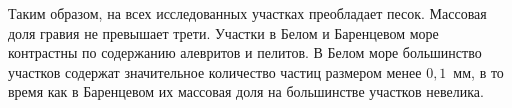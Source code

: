 \par\bigskip
Таким образом, на всех исследованных участках преобладает песок.
Массовая доля гравия не превышает трети.
Участки в Белом и Баренцевом море контрастны по содержанию алевритов и пелитов. 
В Белом море большинство участков содержат значительное количество частиц размером менее $0,1$~мм, в то время как в Баренцевом их массовая доля на большинстве участков невелика.

\afterpage{\clearpage}
